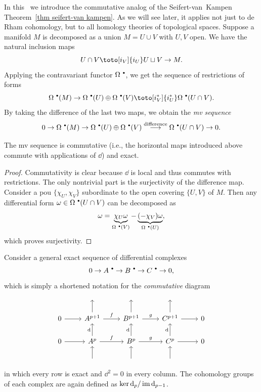 In this \sect\ we introduce the commutative analog of the Seifert-van~Kampen Theorem~\ref{thm seifert-van kampen}. As we will see later, it applies not just to de Rham cohomology, but to all homology theories of topological spaces. Suppose a manifold $M$ is decomposed as a union $M=U\cup V$ with $U,V$ open. We have the natural inclusion maps
\[U\cap V\toto[i_V]{i_U}U\sqcup V\to M. \]
Applying the contravariant functor $\Omega^{\smbullet }$, we get the sequence of restrictions of forms
\[\Omega^{\smbullet }(M)\to \Omega^{\smbullet }(U)\oplus\Omega^{\smbullet }(V)\toto[i_V^\ast]{i_U^\ast}\Omega^{\smbullet }(U\cap V).\]
By taking the difference of the last two maps, we obtain the \emph{\gls{mv} sequence}
\[0\to\Omega^{\smbullet } (M)\to\Omega^{\smbullet }(U)\oplus\Omega^{\smbullet }(V)\overset{\text{difference}}\longrightarrow\Omega^{\smbullet } (U\cap V)\to 0.\]

\begin{prop}
    The \gls{mv} sequence is commutative (i.e., the horizontal maps introduced above commute with applications of $\dd$) and exact.
\end{prop}
\begin{proof}
    Commutativity is clear because $\dd$ is local and thus commutes with restrictions. The only nontrivial part is the surjectivity of the difference map. Consider a \gls{pou} $\{\chi_U,\chi_V\}$ subordinate to the open covering $\{U,V\}$ of $M$. Then any differential form $\omega\in\Omega^{\smbullet }(U\cap V)$ can be decomposed as 
    \[\omega=\underbrace{\chi_U\omega}_{\Omega^{\smbullet }(V)}-\underbrace{(-\chi_V)\omega}_{\Omega^{\smbullet }(U)},\]
    which proves surjectivity.
\end{proof}

Consider a general exact sequence of differential complexes \[0\to A^{\smbullet }\to B^{\smbullet }\to C^{\smbullet } \to 0,\] which is simply a shortened notation for the \emph{commutative} diagram
\[\begin{tikzcd}
        \; & \; & \; &\; &\; \\
        0 \arrow[r]& A^{p+1}\arrow[r,"f"]\arrow[u] &B^{p+1}\arrow[u]\arrow[r,"g"]& C^{p+1}\arrow[r]\arrow[u]& 0\\
       0\arrow[r] & A^p\arrow[r,"f"]\arrow[u,"\dd"] &B^p\arrow[u,"\dd"]\arrow[r,"g"]&C^p\arrow[u,"\dd"]\arrow[r]&0 \\
        &\arrow[u] & \arrow[u]& \arrow[u] &
\end{tikzcd}\]
in which every row is exact and $\dd^2=0$ in every column. The cohomology groups of each complex are again defined as $\ker \mathop{}\!\mathrm{d}_{p}/\operatorname{im} \mathop{}\!\mathrm{d}_{p-1}$. 

